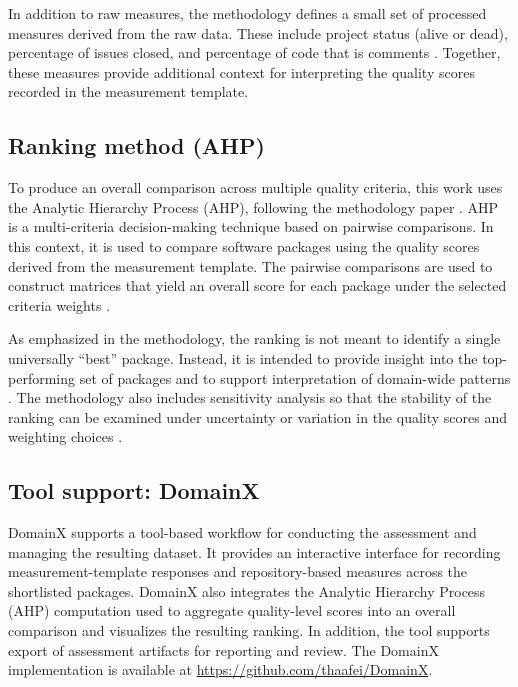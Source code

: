 \documentclass[final,1p,times,authoryear,12pt]{elsarticle}
\providecommand{\wss}[1]{\textcolor{blue}{\textit{#1}}}
\begin{document}
In addition to raw measures, the methodology defines a small
set of processed measures derived from the raw data. These
include project status (alive or dead), percentage of issues
closed, and percentage of code that is comments
\cite{MethodologyPaper}. Together, these measures provide
additional context for interpreting the quality scores
recorded in the measurement template.

\subsection{Ranking method (AHP)}\label{ahp}
To produce an overall comparison across multiple quality
criteria, this work uses the Analytic Hierarchy Process
(AHP), following the methodology paper
\cite{MethodologyPaper}. AHP is a multi-criteria
decision-making technique based on pairwise comparisons. In
this context, it is used to compare software packages using
the quality scores derived from the measurement template.
The pairwise comparisons are used to construct matrices that
yield an overall score for each package under the selected
criteria weights \cite{MethodologyPaper}.

As emphasized in the methodology, the ranking is not meant
to identify a single universally ``best'' package. Instead,
it is intended to provide insight into the top-performing
set of packages and to support interpretation of domain-wide
patterns \cite{MethodologyPaper}. The methodology also
includes sensitivity analysis so that the stability of the
ranking can be examined under uncertainty or variation in
the quality scores and weighting choices \cite{MethodologyPaper}.


\subsection{Tool support: DomainX}\label{domainx}
DomainX supports a tool-based workflow for conducting the
assessment and managing the resulting dataset. It provides an
interactive interface for recording measurement-template
responses and repository-based measures across the shortlisted
packages. DomainX also integrates the Analytic Hierarchy
Process (AHP) computation used to aggregate quality-level
scores into an overall comparison and visualizes the resulting
ranking. In addition, the tool supports export of assessment
artifacts for reporting and review. The DomainX implementation
is available at \url{https://github.com/thaafei/DomainX}.
\end{document}
